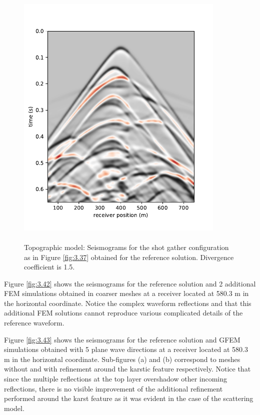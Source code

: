  \begin{figure}[h!]
	\centering
	\includegraphics[width=10cm, height=13cm]{Thesis_Edith/figures/topo/topo_waves/seismogram_topo.pdf}
	\caption{Topographic model: Seismograms for the shot gather configuration as in Figure \ref{fig:3.37} obtained for the reference solution. Divergence coefficient is 1.5.}
	\label{fig:3.41}
\end{figure}

\clearpage
Figure \ref{fig:3.42} shows the seismograms for the reference solution and 2 additional FEM simulations obtained in coarser meshes at a receiver located at 580.3 m in the horizontal coordinate. Notice the complex waveform reflections and that this additional FEM solutions cannot reproduce various complicated details of the reference waveform.

Figure \ref{fig:3.43} shows the seismograms for the reference solution and GFEM simulations obtained with 5 plane wave directions at a receiver located at 580.3 m in the horizontal coordinate. Sub-figures (a) and (b) correspond to meshes without and with refinement around the karstic feature respectively. Notice that since the multiple reflections at the top layer overshadow other incoming reflections, there is no visible improvement of the additional refinement performed around the karst feature as it was evident in the case of the scattering model.


